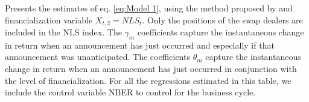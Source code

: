 \begin{landscape}
\begin{table}[]
\begin{tablenotes}
        \singlespacing
        \footnotesize
       Presents the estimates of eq. \ref{eq:Model 1}, using the method proposed by \citep{kurov2019price} and financialization variable $X_{t,2}=NLS_t$. Only the positions of the swap dealers are included in the NLS index. The $\gamma_m$ coefficients capture the instantaneous change in return when an announcement has just occurred and especially if that announcement was unanticipated. The coefficients $\theta_m$ capture the instantaneous change in return when an announcement has just occurred in conjunction with the level of financialization.
For all the regressions estimated in this table, we include the control variable NBER to control for the business cycle. 


    \end{tablenotes}
    
\end{table}
\end{landscape}


